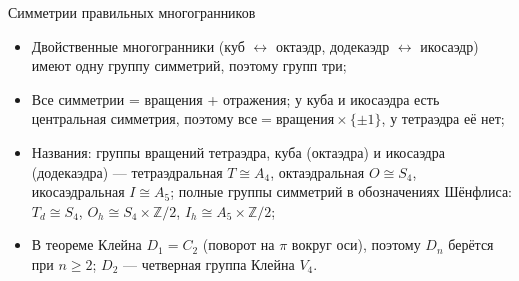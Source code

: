 \documentclass[serif, aspectratio=169]{beamer}
\begin{document}
\begin{frame}{Симметрии правильных многогранников}
{\begin{itemize}
            \item Двойственные многогранники (куб $\leftrightarrow$ октаэдр, додекаэдр $\leftrightarrow$ икосаэдр) имеют одну группу симметрий, поэтому групп три;
            \item Все симметрии = вращения + отражения; у куба и икосаэдра есть центральная симметрия, поэтому $\text{все}=\text{вращения}\times\{\pm1\}$, у тетраэдра её нет;
            \item Названия: группы вращений тетраэдра, куба (октаэдра) и икосаэдра (додекаэдра) --- тетраэдральная $T\cong A_4$, октаэдральная $O\cong S_4$, икосаэдральная $I\cong A_5$; полные группы симметрий в обозначениях Шёнфлиса: $T_d\cong S_4$, $O_h\cong S_4\times\mathbb{Z}/2$, $I_h\cong A_5\times\mathbb{Z}/2$;
            \item В теореме Клейна $D_1=C_2$ (поворот на $\pi$ вокруг оси), поэтому $D_n$ берётся при $n\ge2$; $D_2$ --- четверная группа Клейна $V_4$.
        \end{itemize}
    }
\end{frame}
\end{document}
